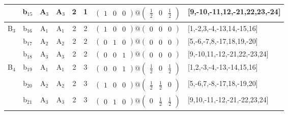 \documentclass[fleqn,10pt,landscape]{article}
\begin{document}
\begin{itemize}
\begin{center}
\begin{longtable}{cc|cc|c|c|c|l}
& b$_{15}$ & A$_{3}$ & A$_{3}$ & 2 & 1 & $\begin{pmatrix} 1 & 0 & 0 \end{pmatrix}@\begin{pmatrix} \frac{1}{2} & 0 & \frac{1}{2} \end{pmatrix}$ & [9,-10,-11,12,-21,22,23,-24] \\ \hline
B$_{3}$ & b$_{16}$ & A$_{1}$ & A$_{1}$ & 2 & 2 & $\begin{pmatrix} 1 & 0 & 0 \end{pmatrix}@\begin{pmatrix} 0 & 0 & 0 \end{pmatrix}$ & [1,-2,3,-4,-13,14,-15,16] \\
& b$_{17}$ & A$_{2}$ & A$_{2}$ & 2 & 2 & $\begin{pmatrix} 0 & 1 & 0 \end{pmatrix}@\begin{pmatrix} 0 & 0 & 0 \end{pmatrix}$ & [5,-6,-7,8,-17,18,19,-20] \\
& b$_{18}$ & A$_{3}$ & A$_{3}$ & 2 & 2 & $\begin{pmatrix} 0 & 0 & 1 \end{pmatrix}@\begin{pmatrix} 0 & 0 & 0 \end{pmatrix}$ & [9,-10,11,-12,-21,22,-23,24] \\ \hline
B$_{4}$ & b$_{19}$ & A$_{1}$ & A$_{1}$ & 2 & 3 & $\begin{pmatrix} 0 & 0 & 1 \end{pmatrix}@\begin{pmatrix} \frac{1}{2} & 0 & \frac{1}{2} \end{pmatrix}$ & [1,2,-3,-4,-13,-14,15,16] \\
& b$_{20}$ & A$_{2}$ & A$_{2}$ & 2 & 3 & $\begin{pmatrix} 1 & 0 & 0 \end{pmatrix}@\begin{pmatrix} \frac{1}{2} & \frac{1}{2} & 0 \end{pmatrix}$ & [5,-6,7,-8,-17,18,-19,20] \\
& b$_{21}$ & A$_{3}$ & A$_{3}$ & 2 & 3 & $\begin{pmatrix} 0 & 1 & 0 \end{pmatrix}@\begin{pmatrix} 0 & \frac{1}{2} & \frac{1}{2} \end{pmatrix}$ & [9,10,-11,-12,-21,-22,23,24] \\
\end{longtable}
\end{center}


\end{itemize}
\end{document}

